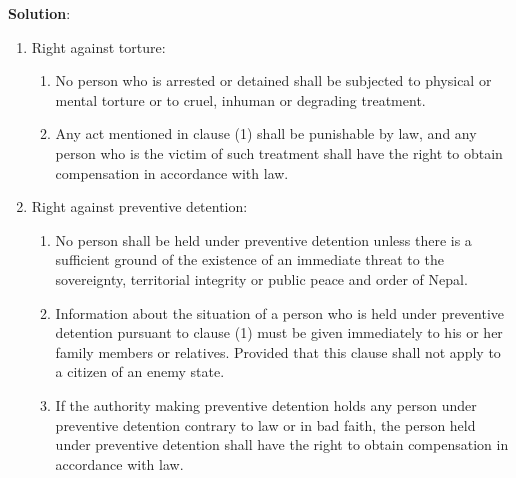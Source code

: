 \documentclass[
  openany]{book}
\newenvironment{solution}{ {\bfseries Solution}:}{}
\begin{document}
\begin{questions}
\begin{solution}
\begin{enumerate}
\item Right against torture:
\begin{enumerate}
\item No person who is arrested or detained shall be subjected to physical or mental torture or to cruel, inhuman or degrading treatment.
\item Any act mentioned in clause (1) shall be punishable by law, and any person who is the victim of such treatment shall have the right to obtain compensation in accordance with law.
\end{enumerate}

\item Right against preventive detention:
\begin{enumerate}
\item No person shall be held under preventive detention unless there is a sufficient ground of the existence of an immediate threat to the sovereignty, territorial integrity or public peace and order of Nepal.
\item Information about the situation of a person who is held under preventive detention pursuant to clause (1) must be given immediately to his or her family members or relatives. Provided that this clause shall not apply to a citizen of an enemy state.
\item If the authority making preventive detention holds any person under preventive detention contrary to law or in bad faith, the person held under preventive detention shall have the right to obtain compensation in accordance with law.
\end{enumerate}


\end{enumerate}
\end{solution}
\end{questions}
\end{document}
